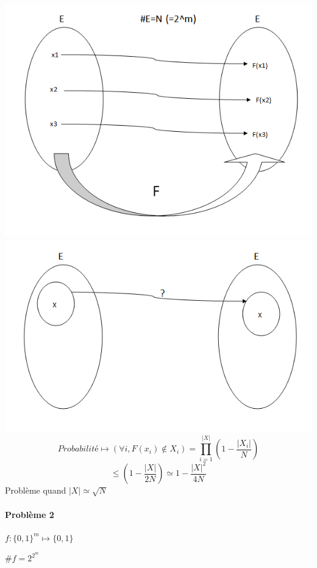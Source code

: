 \documentclass[12pt,a4paper]{article}
\begin{document}
	\includegraphics[width=14cm]{schema1.png} 
	\includegraphics[width=14cm]{schema2.png} 
	\begin{displaymath}
	Probabilité \mapsto (\forall i, F(x_i) \not\in X_i) = \prod^{|X|}_{i=1} (1-\frac{|X_i|}{N})
	\end{displaymath}
	\begin{displaymath}
	\leq (1-\frac{|X|}{2N}) \simeq 1 - \frac{|X|^2}{4N}
	\end{displaymath}
	Problème quand $|X| \simeq \sqrt{N}$
	
	\paragraph{Problème 2}
	
	
$f:\{0,1\}^m \mapsto \{0,1\}$
	
$\# f = 2^{2^m}$
	
\end{document}
